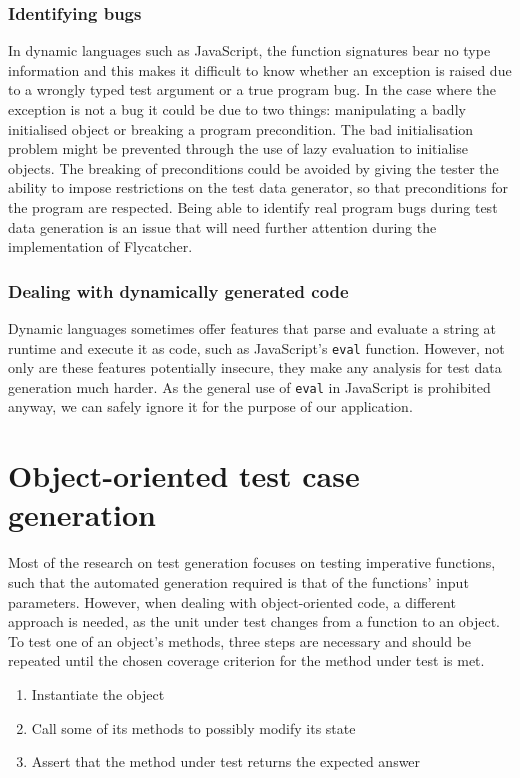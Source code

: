 \documentclass[a4paper,11pt,titlepage]{report}
\begin{document}
\subsubsection{Identifying bugs}

In dynamic languages such as JavaScript, the function signatures bear no type information and this makes it difficult to know whether an exception is raised due to a wrongly typed test argument or a true program bug. In the case where the exception is not a bug it could be due to two things: manipulating a badly initialised object or breaking a program precondition. The bad initialisation problem might be prevented through the use of lazy evaluation to initialise objects. The breaking of preconditions could be avoided by giving the tester the ability to impose restrictions on the test data generator, so that preconditions for the program are respected. Being able to identify real program bugs during test data generation is an issue that will need further attention during the implementation of \textsf{Flycatcher}.

\subsubsection{Dealing with dynamically generated code}

Dynamic languages sometimes offer features that parse and evaluate a string at runtime and execute it as code, such as JavaScript's \texttt{eval} function. However, not only are these features potentially insecure, they make any analysis for test data generation much harder. As the general use of \texttt{eval} in JavaScript is prohibited anyway, we can safely ignore it for the purpose of our application.

\section{Object-oriented test case generation}
Most of the research on test generation focuses on testing imperative functions, such that the automated generation required is that of the functions' input parameters. However, when dealing with object-oriented code, a different approach is needed, as the unit under test changes from a function to an object. To test one of an object's methods, three steps are necessary \cite{tonella2004evolutionary} and should be repeated until the chosen coverage criterion for the method under test is met.
\begin{enumerate}
	\item Instantiate the object
	\item Call some of its methods to possibly modify its state
	\item Assert that the method under test returns the expected answer
\end{enumerate}
\end{document}
